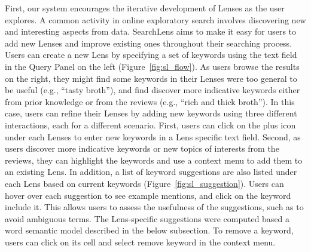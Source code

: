 First, our system encourages the iterative development of Lenses as the user explores. A common activity in online exploratory search involves discovering new and interesting aspects from data. SearchLens aims to make it easy for users to add new Lenses and improve existing ones throughout their searching process. Users can create a new Lens by specifying a set of keywords using the text field in the Query Panel on the left (Figure~\ref{fig:sl_flow}). As users browse the results on the right, they might find some keywords in their Lenses were too general to be useful (e.g., ``tasty broth''), and find discover more indicative keywords either from prior knowledge or from the reviews (e.g., ``rich and thick broth''). In this case, users can refine their Lenses by adding new keywords using three different interactions, each for a different scenario. First, users can click on the plus icon under each Lenses to enter new keywords in a Lens specific text field. Second, as users discover more indicative keywords or new topics of interests from the reviews, they can highlight the keywords and use a context menu to add them to an existing Lens. In addition, a list of keyword suggestions are also listed under each Lens based on current keywords (Figure~\ref{fig:sl_suggestion}). Users can hover over each suggestion to see example mentions, and click on the keyword include it. This allows users to assess the usefulness of the suggestions, such as to avoid ambiguous terms. The Lens-specific suggestions were computed based a word semantic model described in the below subsection. To remove a keyword, users can click on its cell and select remove keyword in the context menu.



